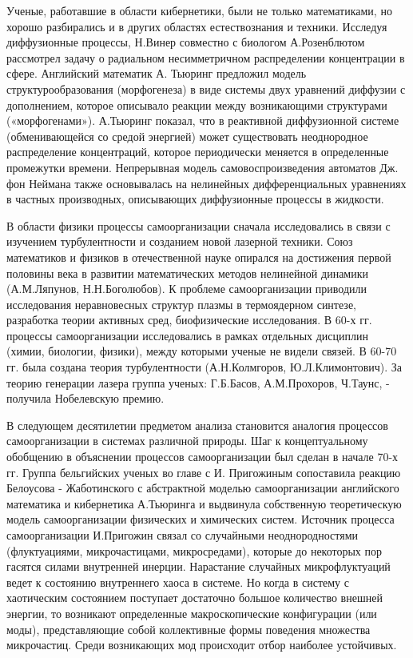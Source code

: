\documentclass[exam_answers.tex]{subfiles}
\begin{document}
Ученые, работавшие в области кибернетики, были не только
математиками, но хорошо разбирались и в других областях естествознания и
техники. Исследуя диффузионные процессы, Н.Винер совместно с биологом
А.Розенблютом рассмотрел задачу о радиальном несимметричном
распределении концентрации в сфере. Английский математик А. Тьюринг
предложил модель структурообразования (морфогенеза) в виде системы двух
уравнений диффузии с дополнением, которое описывало реакции между
возникающими структурами («морфогенами»). А.Тьюринг показал, что в
реактивной диффузионной системе (обменивающейся со средой энергией)
может существовать неоднородное распределение концентраций, которое
периодически меняется в определенные промежутки времени. Непрерывная
модель самовоспроизведения автоматов Дж. фон Неймана также
основывалась на нелинейных дифференциальных уравнениях в частных
производных, описывающих диффузионные процессы в жидкости.

В области физики процессы самоорганизации сначала исследовались в
связи с изучением турбулентности и созданием новой лазерной техники. Союз
математиков и физиков в отечественной науке опирался на достижения первой
половины века в развитии математических методов нелинейной динамики
(А.М.Ляпунов, Н.Н.Боголюбов). К проблеме самоорганизации приводили
исследования неравновесных структур плазмы в термоядерном синтезе, 
разработка теории активных сред, биофизические исследования. В 60-х гг.
процессы самоорганизации исследовались в рамках отдельных дисциплин
(химии, биологии, физики), между которыми ученые не видели связей. В 60-70
гг. была создана теория турбулентности (А.Н.Колмгоров, Ю.Л.Климонтович).
За теорию генерации лазера группа ученых: Г.Б.Басов, А.М.Прохоров, Ч.Таунс,
- получила Нобелевскую премию.

В следующем десятилетии предметом анализа становится аналогия
процессов самоорганизации в системах различной природы. Шаг к
концептуальному обобщению в объяснении процессов самоорганизации был
сделан в начале 70-х гг. Группа бельгийских ученых во главе с И. Пригожиным
сопоставила реакцию Белоусова - Жаботинского с абстрактной моделью
самоорганизации английского математика и кибернетика А.Тьюринга и
выдвинула собственную теоретическую модель самоорганизации физических и
химических систем. Источник процесса самоорганизации И.Пригожин связал
со случайными неоднородностями (флуктуациями, микрочастицами,
микросредами), которые до некоторых пор гасятся силами внутренней инерции.
Нарастание случайных микрофлуктуаций ведет к состоянию внутреннего хаоса
в системе. Но когда в систему с хаотическим состоянием поступает достаточно
большое количество внешней энергии, то возникают определенные
макроскопические конфигурации (или моды), представляющие собой
коллективные формы поведения множества микрочастиц. Среди возникающих
мод происходит отбор наиболее устойчивых.
\end{document}
